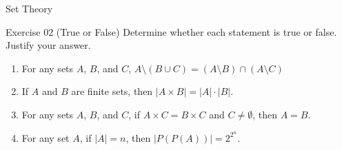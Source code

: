 \documentclass[dvipsnames]{beamer}
\theoremstyle{plain}
\theoremstyle{definition}
\begin{document}
\begin{frame}{Set Theory}

\begin{block}{Exercise 02 (True or False)}
    Determine whether each statement is true or false. Justify your answer.
    \begin{enumerate}
        \item For any sets $A$, $B$, and $C$, $A \setminus (B \cup C) = (A \setminus B) \cap (A \setminus C)$
        \item If $A$ and $B$ are finite sets, then $|A \times B| = |A| \cdot |B|$.
        \item For any sets $A$, $B$, and $C$, if $A \times C = B \times C$ and $C \neq \emptyset$, then $A = B$.
        \item For any set $A$, if $|A| = n$, then $|P(P(A))| = 2^{2^n}$.
    \end{enumerate}

\end{block}

\end{frame}
\end{document}
